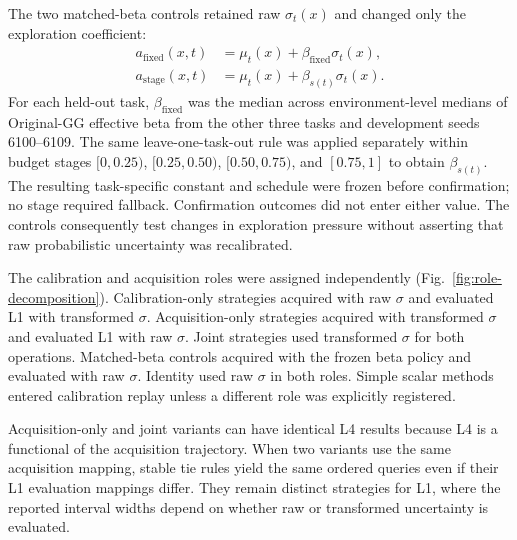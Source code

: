 \documentclass[10pt,twocolumn]{article}
\begin{document}
The two matched-beta controls retained raw $\sigma_t(x)$ and changed only the
exploration coefficient:
\begin{align}
a_{\mathrm{fixed}}(x,t) &=
\mu_t(x)+\beta_{\mathrm{fixed}}\sigma_t(x),\\
a_{\mathrm{stage}}(x,t) &=
\mu_t(x)+\beta_{s(t)}\sigma_t(x).
\end{align}
For each held-out task, $\beta_{\mathrm{fixed}}$ was the median across
environment-level medians of Original-GG effective beta from the other three
tasks and development seeds 6100--6109. The same leave-one-task-out rule was
applied separately within budget stages $[0,0.25)$, $[0.25,0.50)$,
$[0.50,0.75)$, and $[0.75,1]$ to obtain $\beta_{s(t)}$. The resulting
task-specific constant and schedule were frozen before confirmation; no stage
required fallback. Confirmation outcomes did not enter either value. The
controls consequently test changes in exploration pressure without asserting
that raw probabilistic uncertainty was recalibrated.

The calibration and acquisition roles were assigned independently
(Fig.~\ref{fig:role-decomposition}). Calibration-only strategies acquired with raw
$\sigma$ and evaluated L1 with transformed $\sigma$. Acquisition-only
strategies acquired with transformed $\sigma$ and evaluated L1 with raw
$\sigma$. Joint strategies used transformed $\sigma$ for both operations.
Matched-beta controls acquired with the frozen beta policy and evaluated with
raw $\sigma$. Identity used raw $\sigma$ in both roles. Simple scalar methods
entered calibration replay unless a different role was explicitly registered.

Acquisition-only and joint variants can have identical L4 results because L4
is a functional of the acquisition trajectory. When two variants use the same
acquisition mapping, stable tie rules yield the same ordered queries even if
their L1 evaluation mappings differ. They remain distinct strategies for L1,
where the reported interval widths depend on whether raw or transformed
uncertainty is evaluated.
\end{document}

